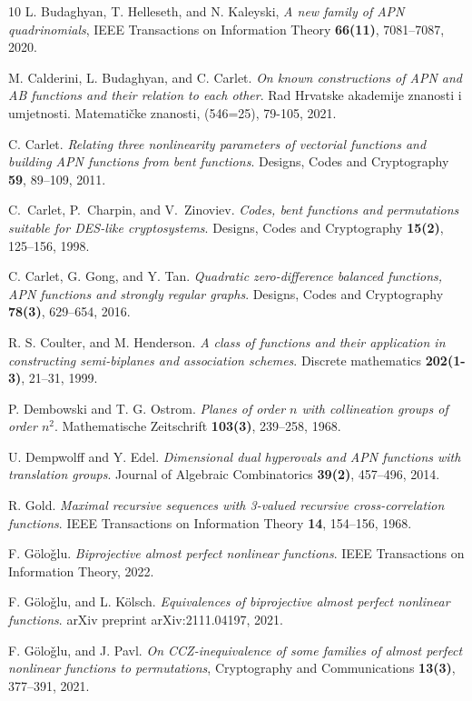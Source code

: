 \documentclass{article}
\begin{document}
\begin{thebibliography}{10}
 L. Budaghyan, T. Helleseth, and N. Kaleyski, \textit{A new family of APN quadrinomials},  IEEE Transactions on Information Theory \textbf{66(11)}, 7081--7087, 2020.


 M. Calderini, L. Budaghyan,  and C. Carlet. \textit{On known constructions of APN and AB functions and their relation to each other}. Rad Hrvatske akademije znanosti i umjetnosti. Matemati\v{c}ke znanosti, (546=25), 79-105, 2021.


 C. Carlet. \textit{Relating three nonlinearity parameters of vectorial functions and building APN functions from bent functions}. {Designs, Codes and Cryptography} \textbf{59}, 89--109, 2011.

C.~Carlet, P.~Charpin, and V.~Zinoviev. \textit{Codes, bent functions and permutations suitable for {DES}-like
  cryptosystems}.  {Designs, Codes and Cryptography} \textbf{15(2)}, 125--156, 1998.

 C. Carlet, G. Gong,  and Y. Tan. \textit{Quadratic zero-difference balanced functions, APN functions and strongly regular graphs}. Designs, Codes and Cryptography \textbf{78(3)}, 629--654, 2016.


R. S. Coulter, and M. Henderson.
 \textit{A class of functions and their application in constructing
  semi-biplanes and association schemes}.
 { Discrete mathematics} \textbf{202(1-3)}, 21--31, 1999.

P. Dembowski and T. G. Ostrom.
 \textit{Planes of order $n$ with collineation groups of order $n^2$}.
 { Mathematische Zeitschrift} \textbf{103(3)}, 239--258, 1968.

U. Dempwolff and Y. Edel.
\textit{ Dimensional dual hyperovals and {APN} functions with translation
  groups}.
 { Journal of Algebraic Combinatorics} \textbf{39(2)}, 457--496, 2014.

 R. Gold. \textit{Maximal recursive sequences with 3-valued recursive cross-correlation functions}. {IEEE Transactions on Information Theory} \textbf{14}, 154--156, 1968.

 F. G\"olo\v{g}lu.  \textit{Biprojective almost perfect nonlinear functions}. IEEE Transactions on Information Theory, 2022.

 F. G\"olo\v{g}lu, and  L. K\"{o}lsch. \textit{Equivalences of biprojective almost perfect nonlinear functions}. arXiv preprint arXiv:2111.04197, 2021.


F. G\"olo\v{g}lu, and J. Pavl. \textit{On CCZ-inequivalence of some families of almost perfect nonlinear functions to permutations}, Cryptography and Communications \textbf{13(3)}, 377--391, 2021.



\end{thebibliography}
\end{document}
